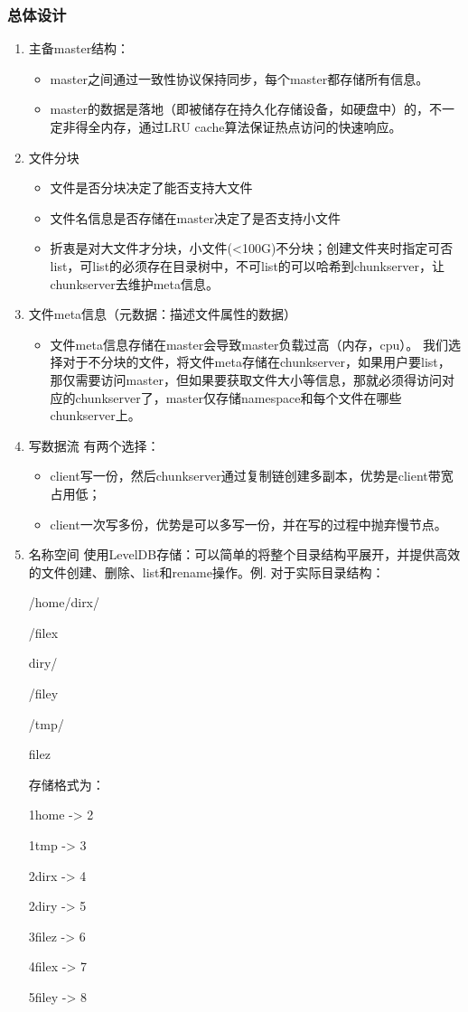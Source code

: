 \documentclass{ctexart}
\begin{document}
\subsubsection{总体设计}
\begin{enumerate}
	\item 主备master结构：
	\begin{itemize}
		\item master之间通过一致性协议保持同步，每个master都存储所有信息。
		\item master的数据是落地（即被储存在持久化存储设备，如硬盘中）的，不一定非得全内存，通过LRU cache算法保证热点访问的快速响应。
	\end{itemize}
	\item 文件分块
	\begin{itemize}
		\item 文件是否分块决定了能否支持大文件
		\item 文件名信息是否存储在master决定了是否支持小文件
		\item 折衷是对大文件才分块，小文件(<100G)不分块；创建文件夹时指定可否list，可list的必须存在目录树中，不可list的可以哈希到chunkserver，让chunkserver去维护meta信息。
	\end{itemize}
	\item 文件meta信息（元数据：描述文件属性的数据）
	\begin{itemize}
		\item 文件meta信息存储在master会导致master负载过高（内存，cpu）。 我们选择对于不分块的文件，将文件meta存储在chunkserver，如果用户要list，那仅需要访问master，但如果要获取文件大小等信息，那就必须得访问对应的chunkserver了，master仅存储namespace和每个文件在哪些chunkserver上。
	\end{itemize}
	\item 写数据流
	有两个选择：
	\begin{itemize}
		\item client写一份，然后chunkserver通过复制链创建多副本，优势是client带宽占用低；
		\item client一次写多份，优势是可以多写一份，并在写的过程中抛弃慢节点。
	\end{itemize}
	\item 名称空间
	使用LevelDB存储：可以简单的将整个目录结构平展开，并提供高效的文件创建、删除、list和rename操作。例. 对于实际目录结构：
	
	/home/dirx/
	
	/filex
	
	diry/
	
	/filey
	
	/tmp/
	
	filez
	
	存储格式为：
	
	1home -> 2
	
	1tmp -> 3
	
	2dirx -> 4
	
	2diry -> 5
	
	3filez -> 6
	
	4filex -> 7
	
	5filey -> 8
\end{enumerate}
\end{document}
